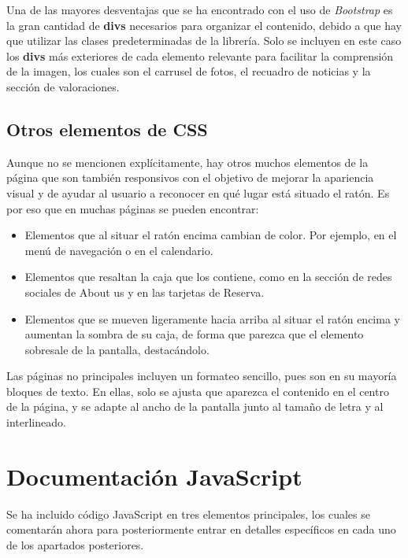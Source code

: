 \documentclass[11pt, a4paper]{book}
\begin{document}
	Una de las mayores desventajas que se ha encontrado con el uso de \textit{Bootstrap} es la gran cantidad de \textbf{divs} necesarios para organizar el contenido, debido a que hay que utilizar las clases predeterminadas de la librería. Solo se incluyen en este caso los \textbf{divs} más exteriores de cada elemento relevante para facilitar la comprensión de la imagen, los cuales son el carrusel de fotos, el recuadro de noticias y la sección de valoraciones.
	
	
	
	\section{Otros elementos de CSS}
	Aunque no se mencionen explícitamente, hay otros muchos elementos de la página que son también responsivos con el objetivo de mejorar la apariencia visual y de ayudar al usuario a reconocer en qué lugar está situado el ratón. Es por eso que en muchas páginas se pueden encontrar:
	
	\begin{itemize}
		\item Elementos que al situar el ratón encima cambian de color. Por ejemplo, en el menú de navegación o en el calendario.
		\item Elementos que resaltan la caja que los contiene, como en la sección de redes sociales de About us y en las tarjetas de Reserva.
		\item Elementos que se mueven ligeramente hacia arriba al situar el ratón encima y aumentan la sombra de su caja, de forma que parezca que el elemento sobresale de la pantalla, destacándolo. 
	\end{itemize}
	
	Las páginas no principales incluyen un formateo sencillo, pues son en su mayoría bloques de texto. En ellas, solo se ajusta que aparezca el contenido en el centro de la página, y se adapte al ancho de la pantalla junto al tamaño de letra y al interlineado.
	
	
	
	
	\chapter{Documentación JavaScript}	
	
	Se ha incluido código JavaScript en tres elementos principales, los cuales se comentarán ahora para posteriormente entrar en detalles específicos en cada uno de los apartados posteriores.
	
\end{document}
